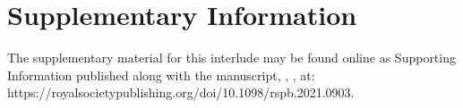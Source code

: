 \let\clearpage\relax
\let\cleardoublepage\relax
\let\cleardoublepage\relax

{\chapter*{Supplementary Information}}

The supplementary material for this interlude may be found online as Supporting Information published along with the manuscript, \textcite{netz2022}, , at:
https://royalsocietypublishing.org/doi/10.1098/rspb.2021.0903.


{ \begin{center}  \end{center} }

\endgroup

\afterpage{\nopagecolor}
\pagestyle{scrheadings}
